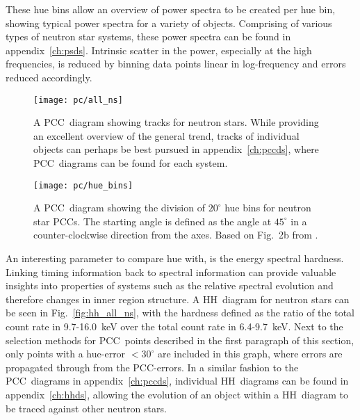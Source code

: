 These hue bins allow an overview of power spectra to be created per hue bin, showing typical power spectra for a variety of objects. Comprising of various types of neutron star systems, these power spectra can be found in appendix~\ref{ch:psds}. Intrinsic scatter in the power, especially at the high frequencies, is reduced by binning data points linear in log-frequency and errors reduced accordingly. \\

\begin{landscape}
\begin{figure}
	\myfloatalign
	{\vspace*{-3cm}\texttt{[image: pc/all\_ns]}}
	\caption[Neutron stars in a \acs{PCC}~diagram]{A \ac{PCC}~diagram showing tracks for neutron stars. While providing an excellent overview of the general trend, tracks of individual objects can perhaps be best pursued in appendix~\ref{ch:pccds}, where \ac{PCC}~diagrams can be found for each system.}\label{fig:pc_all_ns}
\end{figure}
\end{landscape}

\begin{figure}[p]
	\myfloatalign
	{\texttt{[image: pc/hue\_bins]}}
	\caption[Defining the hue in a \acs{PCC}~diagram]{A \ac{PCC}~diagram showing the division of $20^\circ$ hue bins for neutron star \acp{PCC}. The starting angle is defined as the angle at $45^\circ$ in a counter-clockwise direction from the axes. Based on Fig.~2b from \citet{heil2015power}.}\label{fig:pc_hue_bins}
\end{figure}

An interesting parameter to compare hue with, is the energy spectral hardness. Linking timing information back to spectral information can provide valuable insights into properties of systems such as the relative spectral evolution and therefore changes in inner region structure. A \ac{HH}~diagram for neutron stars can be seen in Fig.~\ref{fig:hh_all_ns}, with the hardness defined as the ratio of the total count rate in 9.7-16.0~keV over the total count rate in 6.4-9.7~keV. Next to the selection methods for \ac{PCC}~points described in the first paragraph of this section, only points with a hue-error $<\!30^\circ$ are included in this graph, where errors are propagated through from the \ac{PCC}-errors. In a similar fashion to the \ac{PCC}~diagrams in appendix~\ref{ch:pccds}, individual \ac{HH}~diagrams can be found in appendix~\ref{ch:hhds}, allowing the evolution of an object within a \ac{HH}~diagram to be traced against other neutron stars.\\

